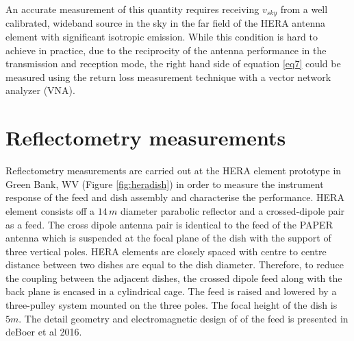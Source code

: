 \documentclass[twocolumn]{emulateapj}
\newcommand{\volt}{{v}}
\newcommand{\dfngexp}{{e^{2\pi i\nu \Delta \tau}}}
\begin{document}

An accurate measurement of this quantity requires receiving $v_{sky}$ from a well calibrated, wideband source in the sky in the far field of the HERA antenna element with significant isotropic emission. While this condition is hard to achieve in practice, due to the reciprocity of the antenna performance in the transmission and reception mode, the right hand side of equation \ref{eq7} could be measured using the return loss measurement technique with a vector network analyzer (VNA). \\

\section{\textbf{Reflectometry measurements}} 

Reflectometry measurements are carried out at the HERA element prototype in Green
Bank, WV (Figure \ref{fig:heradish}) in order to measure the instrument response of the feed and dish assembly and characterise the performance.  HERA element consists off a $14\,m$ diameter
parabolic reflector and a crossed-dipole pair as a feed. The cross dipole antenna pair is identical to the feed of the PAPER antenna which is suspended at the focal plane of the dish with the support of three vertical poles. HERA elements are closely spaced with centre to centre distance between two dishes are equal to the dish diameter. Therefore, to reduce the coupling between the adjacent dishes, the crossed dipole feed along with the back plane is encased in a cylindrical cage. The feed is raised and
lowered by a three-pulley system mounted on the three poles. The focal height of the dish is $5m$.  The detail geometry and electromagnetic design of of the feed is presented in deBoer et al 2016. \\
\end{document}
